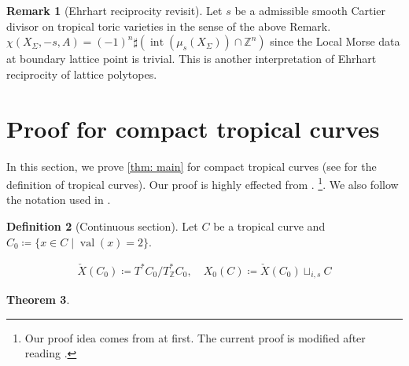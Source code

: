 \documentclass[a4paper,dvipdfmx,reqno,12pt]{amsart}
\theoremstyle{definition}
\newtheorem{Thm}{Theorem}[section]
\newtheorem{Def}[Thm]{Definition}
\newtheorem{Rmk}[Thm]{Remark}
\newcommand{\deq}{\coloneqq}
\newcommand{\Z}{\mathbb{Z}}%
\newcommand{\opn}[1]{\operatorname{#1}}
\numberwithin{equation}{section}
\begin{document}
\begin{Rmk}[{Ehrhart reciprocity revisit}]
Let $s$ be a admissible smooth Cartier divisor on 
tropical toric varieties in the sense of the above Remark.
$\chi(X_{\Sigma},-s,A)=(-1)^{n}\sharp (\opn{int}(\mu_s(X_{\Sigma}))\cap \Z^{n})$ since
the Local Morse data at boundary lattice point is trivial.
This is another interpretation of Ehrhart reciprocity of 
lattice polytopes.
\end{Rmk}

\section{Proof for compact tropical curves}
In this section, we prove \cref{thm: main} for 
compact tropical curves
(see \cite{mikhalkinTropicalCurvesTheir2008a} 
for the definition of tropical curves).
Our proof is highly effected from 
\cite{knill2012graph,MR2676658,auroux2022lagrangian}.
\footnote{Our proof idea comes from 
\cite{knill2012graph,MR2676658} at first.  
The current proof is modified after reading 
\cite{auroux2022lagrangian}.}.
We also follow the notation used in 
\cite{auroux2022lagrangian}.

\begin{Def}[{Continuous section}]
Let $C$ be a tropical curve and 
$C_{0}\deq \{x\in C\mid \opn{val}(x)=2\}$.

\begin{align}
\check{X}(C_0)\deq T^{*}C_0/T^{*}_{\Z}C_0, \quad 
X_0(C)\deq \check{X}(C_0)\sqcup_{i,s}C
\end{align}

\end{Def}

\begin{Thm}


\end{Thm}
\end{document}
